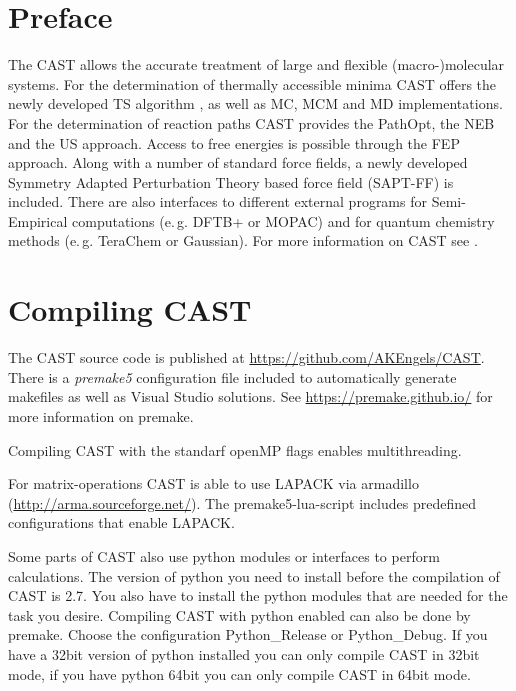 \documentclass[10pt,a4paper]{article} %
\newif\ifdevelopment %
\begin{document}
	\section{Preface}
	The \ac{CAST} allows the accurate treatment of large and flexible (macro-)molecular systems. For the determination of thermally accessible minima \ac{CAST} offers the newly developed \ac{TS} algorithm \supercite{tabusearch}, as well as \ac{MC}\supercite{mc_original}, \ac{MCM}\supercite{MCM_original} and \acf{MD}\supercite{computer_simulation_of_MD} implementations. For the determination of reaction paths \ac{CAST} provides the PathOpt\supercite{pathopt}, the \ac{NEB}\supercite{neb_original} and the \ac{US}\supercite{umbrella_sampling} approach. Access to free energies is possible through the \ac{FEP} approach. Along with a number of standard force fields, a newly developed Symmetry Adapted Perturbation Theory based force field (\acs{SAPT-FF}) is included. There are also interfaces to different external programs for Semi-Empirical computations (e.\,g. DFTB+\supercite{dftb} or MOPAC\supercite{mopac, mopac_parallel}) and for quantum chemistry methods (e.\,g. TeraChem\supercite{terachem} or Gaussian). For more information on \ac{CAST} see \cite{cast}.
	\newpage
	
	
	\ifdevelopment
	\section{Compiling CAST} \label{sec:compile}
	The \ac{CAST} source code is published at \url{https://github.com/AKEngels/CAST}. There is a \textit{premake5} configuration file included to automatically generate makefiles as well as Visual Studio solutions. See \url{https://premake.github.io/} for more information on premake.
	
	Compiling \ac{CAST} with the standarf openMP flags enables multithreading.
	
	For matrix-operations \ac{CAST} is able to use \ac{LAPACK} via armadillo (\url{http://arma.sourceforge.net/}). The premake5-lua-script includes predefined configurations that enable LAPACK. 
	
	Some parts of \ac{CAST} also use python modules or interfaces to perform calculations. The version of python you need to install before the compilation of CAST is 2.7. You also have to install the python modules that are needed for the task you desire. Compiling CAST with python enabled can also be done by premake. Choose the configuration Python\_Release or Python\_Debug. If you have a 32bit version of python installed you can only compile \ac{CAST} in 32bit mode, if you have python 64bit you can only compile \ac{CAST} in 64bit mode. 
	
\end{document}
